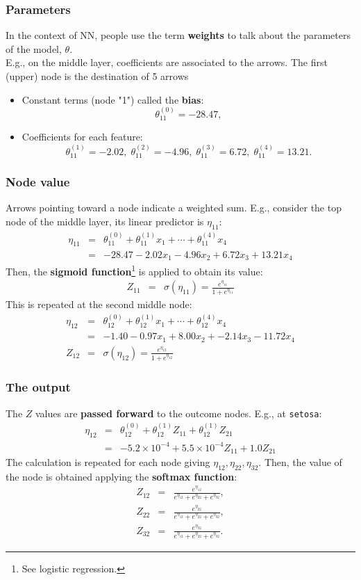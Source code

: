 \begin{frame}
\frametitle{Parameters}
In the context of NN, people use the term {\bf weights} to talk about the parameters of the model, $\theta$.\\
\vspace{0.3cm}
E.g., on the middle layer, coefficients are associated to the arrows. The first (upper) node is the destination of 5 arrows
\begin{itemize}
\item Constant terms (node "1") called the {\bf bias}: 
$$
\theta_{11}^{(0)}=-28.47,
$$
\item Coefficients for each feature: 
$$
\theta_{11}^{(1)}=-2.02,\; \theta_{11}^{(2)}=-4.96,\; \theta_{11}^{(3)}=6.72,\; \theta_{11}^{(4)}=13.21.
$$
\end{itemize}
\end{frame}
\begin{frame}
\frametitle{Node value}
Arrows pointing toward a node indicate a weighted sum. E.g., consider the top node of the middle layer, its linear predictor is $\eta_{11}$:
\begin{eqnarray*}
\eta_{11} &=& \theta_{11}^{(0)} + \theta_{11}^{(1)} x_1 + \cdots + \theta_{11}^{(4)} x_4\\
&=& -28.47 - 2.02 x_1 - 4.96 x_2 + 6.72 x_3 + 13.21 x_4
\end{eqnarray*}
Then, the {\bf sigmoid function}\footnote{See logistic regression.} is applied to obtain its value:
\begin{eqnarray*}
Z_{11} &=& \sigma(\eta_{11}) = \frac{e^{\eta_{11}}}{1+e^{\eta_{11}}}
\end{eqnarray*}
This is repeated at the second middle node:
\begin{eqnarray*}
\eta_{12} &=& \theta_{12}^{(0)} + \theta_{12}^{(1)} x_1 + \cdots + \theta_{12}^{(4)} x_4\\
&=& -1.40 -0.97 x_1 + 8.00 x_2 + -2.14 x_3 - 11.72 x_4\\
Z_{12} &=& \sigma(\eta_{12}) = \frac{e^{\eta_{12}}}{1+e^{\eta_{12}}}
\end{eqnarray*}
\end{frame}
\begin{frame}
\frametitle{The output}
The $Z$ values are {\bf passed forward} to the outcome nodes. E.g., at {\tt setosa}:
\begin{eqnarray*}
\eta_{12} &=& \theta_{12}^{(0)} + \theta_{12}^{(1)} Z_{11} + \theta_{12}^{(1)} Z_{21} \\
 &=& -5.2\times 10^{-4} + 5.5\times 10^{-4} Z_{11} + 1.0 Z_{21} 
\end{eqnarray*}
The calculation is repeated for each node giving $\eta_{12}, \eta_{22}, \eta_{32}$. Then, the value of the node is obtained applying the {\bf softmax function}:
\begin{eqnarray*}
Z_{12} &=& \frac{e^{\eta_{12}}}{e^{\eta_{12}}+e^{\eta_{22}}+e^{\eta_{32}}},\\
Z_{22} &=& \frac{e^{\eta_{22}}}{e^{\eta_{12}}+e^{\eta_{22}}+e^{\eta_{32}}},\\
Z_{32} &=& \frac{e^{\eta_{32}}}{e^{\eta_{12}}+e^{\eta_{22}}+e^{\eta_{32}}}.
\end{eqnarray*}
\end{frame}
